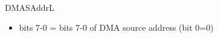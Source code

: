 \\
DMASAddrL
\begin{itemize}
\item bits 7-0 = bits 7-0 of DMA source address (bit 0=0)
\end{itemize}


